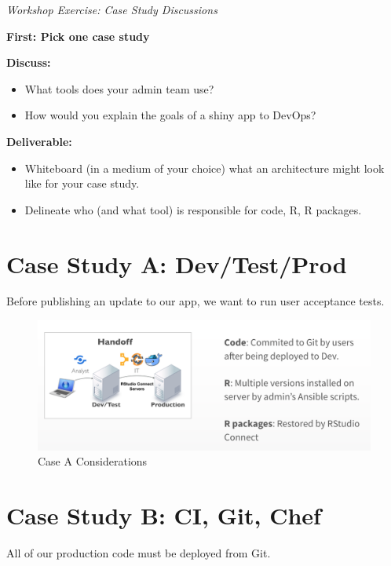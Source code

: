 \documentclass[]{book}
\providecommand{\tightlist}{%
  \setlength{\itemsep}{0pt}\setlength{\parskip}{0pt}}
\theoremstyle{definition}
\theoremstyle{definition}
\theoremstyle{definition}
\theoremstyle{remark}
\begin{document}
\emph{Workshop Exercise: Case Study Discussions}

\textbf{First: Pick one case study}

\textbf{Discuss:}

\begin{itemize}
\tightlist
\item
  What tools does your admin team use?
\item
  How would you explain the goals of a shiny app to DevOps?
\end{itemize}

\textbf{Deliverable:}

\begin{itemize}
\tightlist
\item
  Whiteboard (in a medium of your choice) what an architecture might
  look like for your case study.
\item
  Delineate who (and what tool) is responsible for code, R, R packages.
\end{itemize}

\hypertarget{case-study-a-devtestprod}{%
\section{Case Study A: Dev/Test/Prod}\label{case-study-a-devtestprod}}

Before publishing an update to our app, we want to run user acceptance
tests.

\begin{figure}
\centering
\includegraphics{imgs/case-studies/case-a.png}
\caption{Case A Considerations}
\end{figure}

\hypertarget{case-study-b-ci-git-chef}{%
\section{Case Study B: CI, Git, Chef}\label{case-study-b-ci-git-chef}}

All of our production code must be deployed from Git.
\end{document}
